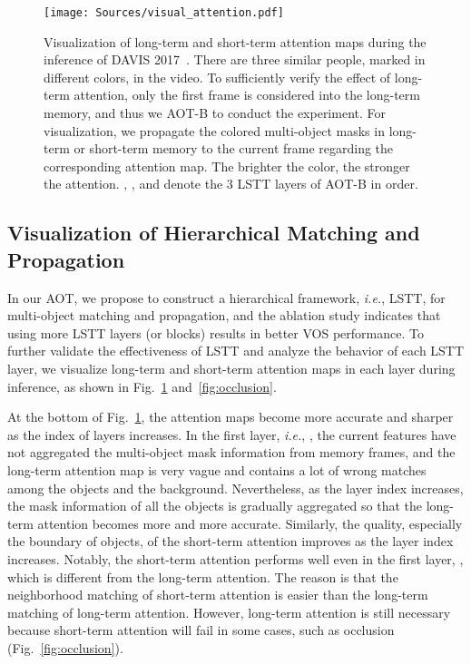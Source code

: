 \documentclass{article}
\def\ie{\emph{i.e.}}
\begin{document}
\begin{figure}[t!]
    \centering
    \texttt{[image: Sources/visual\_attention.pdf]}

    \caption{Visualization of long-term and short-term attention maps during the inference of DAVIS 2017~\cite{davis2017}. There are three similar people, marked in different colors, in the video. To sufficiently verify the effect of long-term attention, only the first frame is considered into the long-term memory, and thus we AOT-B to conduct the experiment. For visualization, we propagate the colored multi-object masks in long-term or short-term memory to the current frame regarding the corresponding attention map. The brighter the color, the stronger the attention. , , and  denote the 3 LSTT layers of AOT-B in order.}
    \label{fig:attention}

\end{figure} \subsection{Visualization of Hierarchical Matching and Propagation}

In our AOT, we propose to construct a hierarchical framework, \ie, LSTT, for multi-object matching and propagation, and the ablation study indicates that using more LSTT layers (or blocks) results in better VOS performance. To further validate the effectiveness of LSTT and analyze the behavior of each LSTT layer, we visualize long-term and short-term attention maps in each layer during inference, as shown in Fig.~\ref{fig:attention} and~\ref{fig:occlusion}.


At the bottom of Fig.~\ref{fig:attention}, the attention maps become more accurate and sharper as the index of layers increases. In the first layer, \ie, , the current features have not aggregated the multi-object mask information from memory frames, and the long-term attention map is very vague and contains a lot of wrong matches among the objects and the background. Nevertheless, as the layer index increases, the mask information of all the objects is gradually aggregated so that the long-term attention becomes more and more accurate. Similarly, the quality, especially the boundary of objects, of the short-term attention improves as the layer index increases. Notably, the short-term attention performs well even in the first layer, , which is different from the long-term attention. The reason is that the neighborhood matching of short-term attention is easier than the long-term matching of long-term attention. However, long-term attention is still necessary because short-term attention will fail in some cases, such as occlusion (Fig.~\ref{fig:occlusion}).
\end{document}
